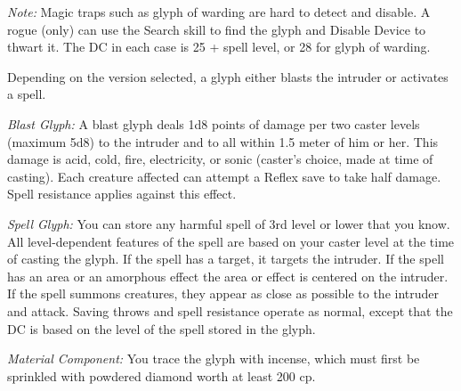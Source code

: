 {	\textit{Note:} Magic traps such as glyph of warding are hard to detect and disable. A rogue (only) can use the Search skill to find the glyph and Disable Device to thwart it. The DC in each case is 25 + spell level, or 28 for glyph of warding.

	Depending on the version selected, a glyph either blasts the intruder or activates a spell.

	\textit{Blast Glyph:}
	A blast glyph deals 1d8 points of damage per two caster levels (maximum 5d8) to the intruder and to all within 1.5 meter of him or her. This damage is acid, cold, fire, electricity, or sonic (caster's choice, made at time of casting). Each creature affected can attempt a Reflex save to take half damage. Spell resistance applies against this effect.

	\textit{Spell Glyph:}
	You can store any harmful spell of 3rd level or lower that you know. All level-dependent features of the spell are based on your caster level at the time of casting the glyph. If the spell has a target, it targets the intruder. If the spell has an area or an amorphous effect the area or effect is centered on the intruder. If the spell summons creatures, they appear as close as possible to the intruder and attack. Saving throws and spell resistance operate as normal, except that the DC is based on the level of the spell stored in the glyph.

	\textit{Material Component:}
	You trace the glyph with incense, which must first be sprinkled with powdered diamond worth at least 200 cp.

}

